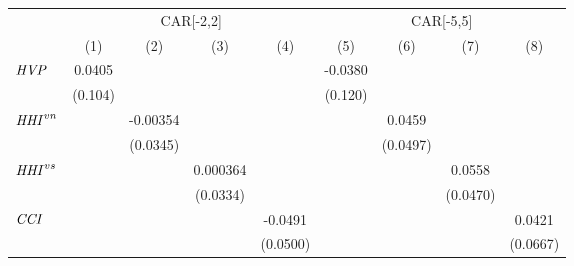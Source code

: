 {
\def\sym#1{\ifmmode^{#1}\else\(^{#1}\)\fi}
\begin{tabular}{l*{8}{c}}
\toprule
                    &\multicolumn{4}{c}{CAR[-2,2]}                                                          &\multicolumn{4}{c}{CAR[-5,5]}                                                          \\\cmidrule(lr){2-5}\cmidrule(lr){6-9}
                    &\multicolumn{1}{c}{(1)}         &\multicolumn{1}{c}{(2)}         &\multicolumn{1}{c}{(3)}         &\multicolumn{1}{c}{(4)}         &\multicolumn{1}{c}{(5)}         &\multicolumn{1}{c}{(6)}         &\multicolumn{1}{c}{(7)}         &\multicolumn{1}{c}{(8)}         \\
\midrule
${\it HVP}$         &      0.0405         &                     &                     &                     &     -0.0380         &                     &                     &                     \\
                    &     (0.104)         &                     &                     &                     &     (0.120)         &                     &                     &                     \\
${\it HHI}^{vn}$    &                     &    -0.00354         &                     &                     &                     &      0.0459         &                     &                     \\
                    &                     &    (0.0345)         &                     &                     &                     &    (0.0497)         &                     &                     \\
${\it HHI}^{vs}$    &                     &                     &    0.000364         &                     &                     &                     &      0.0558         &                     \\
                    &                     &                     &    (0.0334)         &                     &                     &                     &    (0.0470)         &                     \\
${\it CCI}$         &                     &                     &                     &     -0.0491         &                     &                     &                     &      0.0421         \\
                    &                     &                     &                     &    (0.0500)         &                     &                     &                     &    (0.0667)         \\

\end{tabular}}
